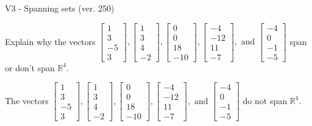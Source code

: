 \begin{exercise}
  \begin{exerciseTitle}V3 - Spanning sets (ver. 250)\end{exerciseTitle}
  \begin{exerciseStatement}
    Explain why the vectors \(\left[\begin{array}{r}
1 \\
3 \\
-5 \\
3
\end{array}\right] , \left[\begin{array}{r}
1 \\
3 \\
4 \\
-2
\end{array}\right] , \left[\begin{array}{r}
0 \\
0 \\
18 \\
-10
\end{array}\right] , \left[\begin{array}{r}
-4 \\
-12 \\
11 \\
-7
\end{array}\right] , \text{ and } \left[\begin{array}{r}
-4 \\
0 \\
-1 \\
-5
\end{array}\right]\) span or don't span \(\mathbb{R}^4\). 
	


  \end{exerciseStatement}
  \begin{exerciseAnswer}
   The vectors \(\left[\begin{array}{r}
1 \\
3 \\
-5 \\
3
\end{array}\right] , \left[\begin{array}{r}
1 \\
3 \\
4 \\
-2
\end{array}\right] , \left[\begin{array}{r}
0 \\
0 \\
18 \\
-10
\end{array}\right] , \left[\begin{array}{r}
-4 \\
-12 \\
11 \\
-7
\end{array}\right] , \text{ and } \left[\begin{array}{r}
-4 \\
0 \\
-1 \\
-5
\end{array}\right]\) 
  	 do not  
	span \(\mathbb{R}^4\).
  



\end{exerciseAnswer}
\end{exercise}
